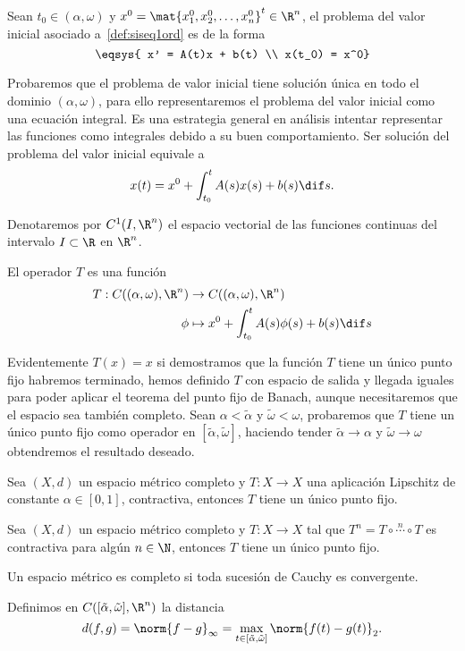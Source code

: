 \documentclass[../main.tex]{subfiles}
\begin{document}
\begin{definition}
	Sean \(t_0 \in (\alpha, \omega)\) y 
	\(x^0 = \mat{x^0_1, x^0_2, \dots, x^0_n}^t \in \R^n\), el problema del valor
	inicial asociado a~\ref{def:siseq1ord} es de la forma
	\[\eqsys{
		x' = A(t)x + b(t) \\
		x(t_0) = x^0}\]
\end{definition}

Probaremos que el problema de valor inicial tiene solución única en todo el
dominio \((\alpha, \omega)\), para ello representaremos el problema del valor 
inicial como una ecuación integral. Es una estrategia general en análisis 
intentar representar las funciones como integrales debido a su buen
comportamiento. Ser solución del problema del valor inicial equivale a
\[x(t) = x^0 + \int_{t_0}^t A(s)x(s) + b(s) \dif s.\]

Denotaremos por \(C^1(I, \R^n)\) el espacio vectorial de las funciones continuas
del intervalo \(I \subset \R\) en \(\R^n\).

\begin{definition}
	El operador \(T\) es una función
	\begin{align*}
		T : C((\alpha, \omega), \R^n) &\to C((\alpha, \omega), \R^n) \\
		\phi  &\mapsto x^0 + \int_{t_0}^t A(s) \phi(s) + b(s) \dif s
	\end{align*}
\end{definition}

Evidentemente \(T(x) = x\) si demostramos que la función \(T\) tiene un único
punto fijo habremos terminado, hemos definido \(T\) con espacio de
salida y llegada iguales para poder aplicar el teorema del punto fijo de Banach,
aunque necesitaremos que el espacio sea también completo. Sean
\(\alpha < \tilde{\alpha}\) y \(\tilde{\omega} < \omega\), probaremos que 
\(T\) tiene un único punto fijo como operador en 
\([\tilde{\alpha}, \tilde{\omega}]\), haciendo tender 
\(\tilde{\alpha} \to \alpha\) y \(\tilde{\omega} \to \omega\) obtendremos el
resultado deseado.

\begin{theorem}
	Sea \((X, d)\) un espacio métrico completo y \(T : X \to X\) una aplicación
	Lipschitz de constante \(\alpha \in [0, 1]\), contractiva, entonces \(T\)
	tiene un único punto fijo.
\end{theorem}

\begin{corollary}
	Sea \((X, d)\) un espacio métrico completo y \(T : X \to X\) tal que 
	\(T^n = T \circ \stackrel{n}{\cdots} \circ T\) es contractiva para algún
	\(n \in \N\), entonces \(T\) tiene un único punto fijo.
\end{corollary}

\begin{definition}
	Un espacio métrico es completo si toda sucesión de Cauchy es convergente.
\end{definition}

Definimos en \(C([\tilde{\alpha}, \tilde{\omega}], \R^n)\) la distancia 
\[d(f, g) = \norm{f - g}_{\infty} = 
	\max_{t \in [\tilde{\alpha}, \tilde{\omega}]} \norm{f(t) - g(t)}_2 .\]
\end{document}
